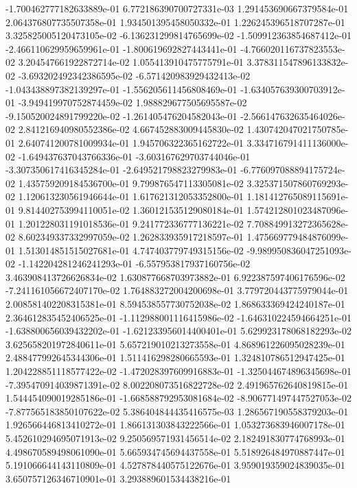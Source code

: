 -1.700462777182633889e-01
6.772186390700727331e-03
1.291453690667379584e-01
2.064376807735507358e-01
1.934501395458050332e-01
1.226245396518707287e-01
3.325825005120473105e-02
-6.136231299814765699e-02
-1.509912363854687412e-01
-2.466110629959659961e-01
-1.800619692827443441e-01
-4.766020116737823553e-02
3.204547661922872714e-02
1.055413910475775791e-01
3.378311547896133832e-02
-3.693202492342386595e-02
-6.571420983929432413e-02
-1.043438897382139297e-01
-1.556205611456808469e-01
-1.634057639300703912e-01
-3.949419970752874459e-02
1.988829677505695587e-02
-9.150520024891799220e-02
-1.261405476204582043e-01
-2.566147632635464026e-02
2.841216940980552386e-02
4.667452883009445830e-02
1.430742047021750785e-01
2.640741200781009934e-01
1.945706322365162722e-01
3.334716791411136000e-02
-1.649437637043766336e-01
-3.603167629703744046e-01
-3.307350617416345284e-01
-2.649521798823279983e-01
-6.776097088894175724e-02
1.435759209184536700e-01
9.799876547113305081e-02
3.325371507860769293e-02
1.120613230561946644e-01
1.617621312053352800e-01
1.181412765089115691e-01
9.814402753994110051e-02
1.360121535129080184e-01
1.574212801023487096e-01
1.201228031191018536e-01
9.241772336777136221e-02
7.708849913272365628e-02
8.602349337332997059e-02
1.262833935917218597e-01
1.475669779484876099e-01
1.513014851515027681e-01
4.747403779749315156e-02
-9.989950836047251093e-02
-1.142204281246241293e-01
-6.557953817937160756e-02
3.463908413726626834e-02
1.630877668703973882e-01
6.922387597406176596e-02
-7.241161056672407170e-02
1.764883272004200698e-01
3.779720443775979044e-01
2.008581402208315381e-01
8.594538557730752038e-02
1.868633369424240187e-01
2.364612835452406525e-01
-1.112988001116415986e-02
-1.646310224594664251e-01
-1.638800656039432202e-01
-1.621233956014400401e-01
5.629923178068182293e-02
3.625658201972840611e-01
5.657219010213273558e-01
4.868961226095028239e-01
2.488477992645344306e-01
1.511416298280665593e-01
1.324810786512947425e-01
1.204228851118577422e-02
-1.472028397609916883e-01
-1.325044674896345698e-01
-7.395470914039871391e-02
8.002208073516822728e-02
2.491965762640819815e-01
1.544454090019285186e-01
-1.668588792953081684e-02
-8.906771497447527053e-02
-7.877565183850107622e-02
5.386404844435416575e-03
1.286567190558379203e-01
1.926566446813410272e-01
1.866131303843222566e-01
1.053273683946007178e-01
5.452610294695071913e-02
9.250569571931456514e-02
2.182491830774768993e-01
4.498670589498061090e-01
5.665934745694437558e-01
5.518926484970887447e-01
5.191066644143110809e-01
4.527878440575122676e-01
3.959019359024839035e-01
3.650757126346710901e-01
3.293889601534438216e-01
